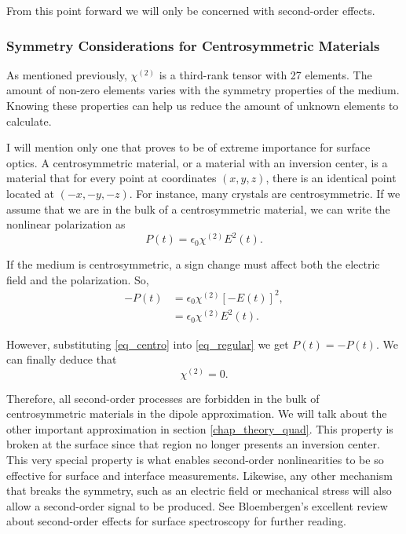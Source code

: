 \documentclass[10pt]{article}
\begin{document}
From this point forward we will only be concerned with second-order effects.

\subsubsection{Symmetry Considerations for Centrosymmetric Materials}\label{chap_theory_sym}
As mentioned previously, $\chi^{(2)}$ is a third-rank tensor with 27 elements. The amount of non-zero elements varies with the symmetry properties of the medium. Knowing these properties can help us reduce the amount of unknown elements to calculate.

I will mention only one that proves to be of extreme importance for surface optics. A centrosymmetric material, or a material with an inversion center, is a material that for every point at coordinates $(x,y,z)$, there is an identical point located at $(-x,-y,-z)$. For instance, many crystals are centrosymmetric. If we assume that we are in the bulk of a centrosymmetric material, we can write the nonlinear polarization as
\begin{equation}
{P}(t) = \epsilon_{0}\chi^{(2)}{E}^{2}(t).\label{eq_regular}
\end{equation}

If the medium is centrosymmetric, a sign change must affect both the electric field and the polarization. So,
\begin{align}
-{P}(t) &= \epsilon_{0}\chi^{(2)}\left[-{E}(t)\right]^{2},\\
              &= \epsilon_{0}\chi^{(2)}{E}^{2}(t).\label{eq_centro}
\end{align}

However, substituting \eqref{eq_centro} into \eqref{eq_regular} we get ${P}(t) = -{P}(t)$. We can finally deduce that
\begin{equation}
\chi^{(2)} = 0.
\end{equation}

Therefore, all second-order processes are forbidden in the bulk of centrosymmetric materials in the dipole approximation. We will talk about the other important approximation in section \ref{chap_theory_quad}. This property is broken at the surface since that region no longer presents an inversion center.  This very special property is what enables second-order nonlinearities to be so effective for surface and interface measurements. Likewise, any other mechanism that breaks the symmetry, such as an electric field or mechanical stress will also allow a second-order signal to be produced. See Bloembergen's \cite{bloembergen1999surface} excellent review about second-order effects for surface spectroscopy for further reading. 
\end{document}
